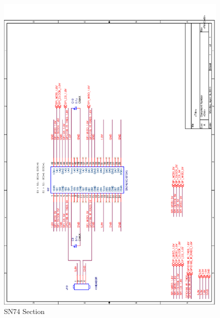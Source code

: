 \documentclass[11pt]{report} %
\begin{document}
	\begin{figure}[H]
		\centering
		\includegraphics[scale=0.50]{images/final_sn74.png}
		\caption{SN74 Section}\label{fig:finalsn74_board}
	\end{figure}
\end{document}
